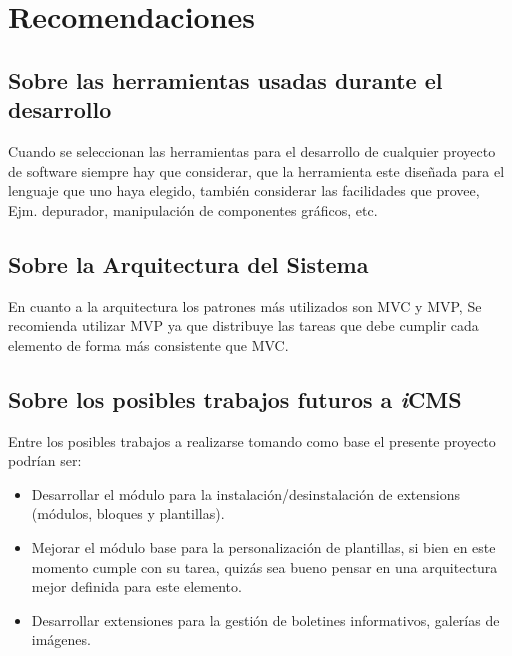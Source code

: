 \section{Recomendaciones}

\subsection{Sobre las herramientas usadas durante el desarrollo}
Cuando se seleccionan las herramientas para el desarrollo de cualquier proyecto de software siempre hay que considerar, que la herramienta este dise\~nada para el lenguaje que uno haya elegido, tambi\'en considerar las facilidades que provee, Ejm. depurador, manipulaci\'on de componentes gr\'aficos, etc.

\subsection{Sobre la Arquitectura del Sistema}
En cuanto a la arquitectura los patrones m\'as utilizados son MVC y MVP, Se recomienda utilizar MVP ya que distribuye las tareas que debe cumplir cada elemento de forma m\'as consistente que MVC.

\subsection{Sobre los posibles trabajos futuros a \textit{i}CMS}
Entre los posibles trabajos a realizarse tomando como base el presente proyecto podr\'ian ser:
\begin{itemize}
\item Desarrollar el m\'odulo para la instalaci\'on/desinstalaci\'on de extensions (m\'odulos, bloques y plantillas).
\item Mejorar el m\'odulo base para la personalizaci\'on de plantillas, si bien en este momento cumple con su tarea, quiz\'as sea bueno pensar en una arquitectura mejor definida para este elemento.
\item Desarrollar extensiones para la gesti\'on de boletines informativos, galer\'ias de im\'agenes.
\end{itemize}

\clearpage
